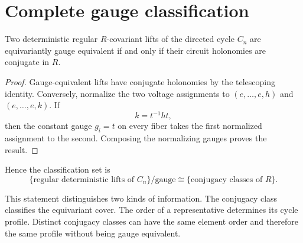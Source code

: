 \section{Complete gauge classification}

\begin{theorem}
Two deterministic regular $R$-covariant lifts of the directed cycle $C_n$
are equivariantly gauge equivalent if and only if their circuit holonomies
are conjugate in $R$.
\end{theorem}

\begin{proof}
Gauge-equivalent lifts have conjugate holonomies by the telescoping identity.
Conversely, normalize the two voltage assignments to
$(e,\ldots,e,h)$ and $(e,\ldots,e,k)$. If
\[
k=t^{-1}ht,
\]
then the constant gauge $g_i=t$ on every fiber takes the first normalized
assignment to the second. Composing the normalizing gauges proves the result.
\end{proof}

Hence the classification set is
\[
\{\text{regular deterministic lifts of }C_n\}/\text{gauge}
\cong
\{\text{conjugacy classes of }R\}.
\]

This statement distinguishes two kinds of information. The conjugacy class
classifies the equivariant cover. The order of a representative determines
its cycle profile. Distinct conjugacy classes can have the same element order
and therefore the same profile without being gauge equivalent.

